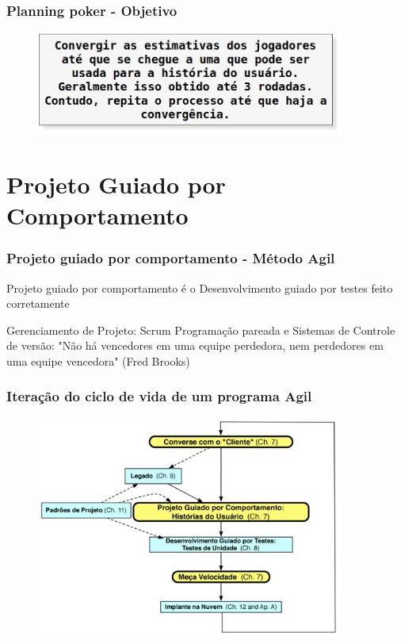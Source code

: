 \begin{frame}
 \frametitle{Planning poker - Objetivo}
  \begin{figure}
   \centering
   \includegraphics[width = 0.9\textwidth]{figs/obj_planning_poker.png}
  \end{figure}
\end{frame}	

\section{Projeto Guiado por Comportamento}
\begin{frame}
 \frametitle{Projeto guiado por comportamento - Método Agil}
 \begin{block}{}
  Projeto guiado por comportamento é o Desenvolvimento guiado por testes feito corretamente
 \end{block}
\end{frame}

\begin{frame}
 \begin{block}{Gerenciamento de Projeto: Scrum}
  Programação pareada e Sistemas de Controle de versão: "Não há vencedores em uma equipe perdedora,
  nem perdedores em uma equipe vencedora" (Fred Brooks)
 \end{block}
 \end{frame}
 
\begin{frame}
 \frametitle{Iteração do ciclo de vida de um programa Agil}
  \begin{figure}
   \centering
   \includegraphics[width = 0.9\textwidth]{figs/fig1.png}
  \end{figure}
\end{frame}


